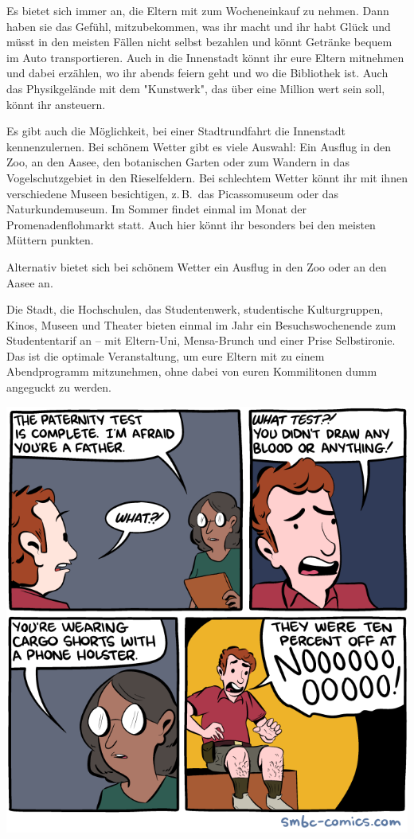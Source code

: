 \begin{multicols}{2}
Es bietet sich immer an, die Eltern mit zum Wocheneinkauf zu nehmen.
Dann haben sie das Gefühl, mitzubekommen, was ihr macht und ihr habt Glück und müsst in den meisten Fällen nicht selbst bezahlen und könnt Getränke bequem im Auto transportieren.
Auch in die Innenstadt könnt ihr eure Eltern mitnehmen und dabei erzählen, wo ihr abends feiern geht und wo die Bibliothek ist.
Auch das Physikgelände mit dem "Kunstwerk", das über eine Million wert sein soll, könnt ihr ansteuern.

Es gibt auch die Möglichkeit, bei einer Stadtrundfahrt die Innenstadt kennenzulernen.
Bei schönem Wetter gibt es viele Auswahl: Ein Ausflug in den Zoo, an den Aasee, den botanischen Garten oder zum Wandern in das Vogelschutzgebiet in den Rieselfeldern.
Bei schlechtem Wetter könnt ihr mit ihnen verschiedene Museen besichtigen, z.\,B.\ das Picassomuseum oder das Naturkundemuseum.
Im Sommer findet einmal im Monat der Promenadenflohmarkt statt.
Auch hier könnt ihr besonders bei den meisten Müttern punkten.

Alternativ bietet sich bei schönem Wetter ein Ausflug in den Zoo oder an den Aasee an.

Die Stadt, die Hochschulen, das Studentenwerk, studentische Kulturgruppen, Kinos, Museen und Theater bieten einmal im Jahr ein Besuchswochenende zum Studententarif an -- mit Eltern-Uni, Mensa-Brunch und einer Prise Selbstironie.
Das ist die optimale Veranstaltung, um eure Eltern mit zu einem Abendprogramm mitzunehmen, ohne dabei von euren Kommilitonen dumm angeguckt zu werden.

\begin{center}
	\includegraphics[width=\columnwidth, height=0.28\textheight]{res/smbc/2016-05-15_paternity-test.png}
\end{center}


\end{multicols}

